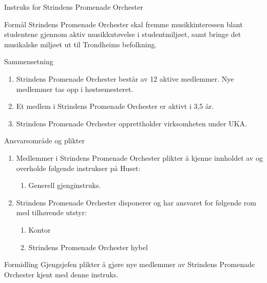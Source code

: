 \begin{instruks*}{Instruks for Strindens Promenade Orchester}
    \begin{instruksledd}{Formål}
        Strindens Promenade Orchester skal fremme musikkinteressen blant studentene gjennom aktiv
        musikkutøvelse i studentmiljøet, samt bringe det musikalske miljøet ut til Trondheims befolkning.
    \end{instruksledd}

    \begin{instruksledd}{Sammensetning}
        \begin{enumerate}
            \item Strindens Promenade Orchester består av 12 aktive medlemmer. Nye medlemmer tas opp i høstsemesteret.
            \item Et medlem i Strindens Promenade Orchester er aktivt i 3,5 år.
            \item Strindens Promenade Orchester opprettholder virksomheten under UKA.
        \end{enumerate}
    \end{instruksledd}

    \begin{instruksledd}{Ansvarsområde og plikter}
        \begin{enumerate}
            \item Medlemmer i Strindens Promenade Orchester plikter å kjenne innholdet av og overholde følgende instrukser
                på Huset:
                \begin{enumerate}
                    \item Generell gjenginstruks.
                \end{enumerate}
        \item Strindens Promenade Orchester disponerer og har ansvaret for følgende rom med tilhørende utstyr:
            \begin{enumerate}
                \item Kontor
                \item Strindens Promenade Orchester hybel
            \end{enumerate}
        \end{enumerate}
    \end{instruksledd}

    \begin{instruksledd}{Formidling}
        Gjengsjefen plikter å gjøre nye medlemmer av Strindens Promenade Orchester kjent med denne instruks.
    \end{instruksledd}

\end{instruks*}

